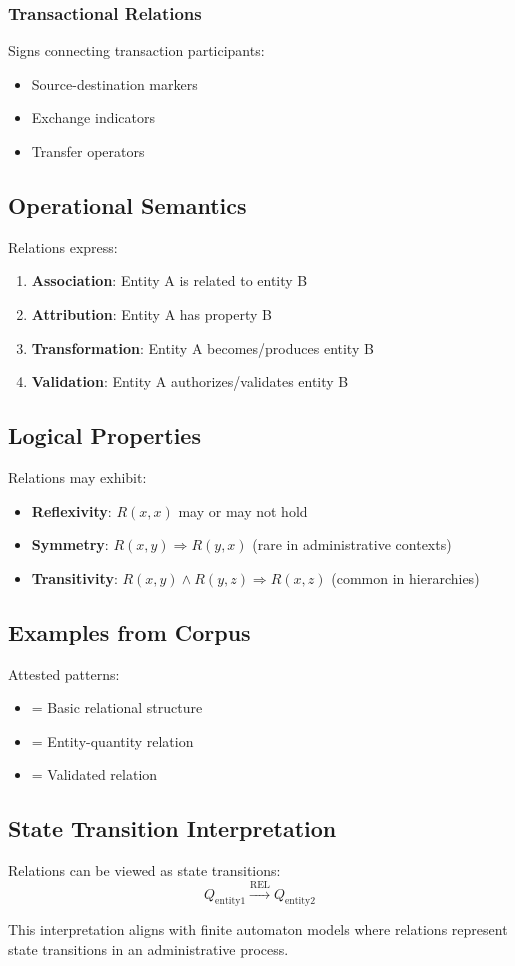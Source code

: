 \subsubsection{Transactional Relations}
Signs connecting transaction participants:
\begin{itemize}
    \item Source-destination markers
    \item Exchange indicators
    \item Transfer operators
\end{itemize}

\subsection{Operational Semantics}

Relations express:
\begin{enumerate}
    \item \textbf{Association}: Entity A is related to entity B
    \item \textbf{Attribution}: Entity A has property B
    \item \textbf{Transformation}: Entity A becomes/produces entity B
    \item \textbf{Validation}: Entity A authorizes/validates entity B
\end{enumerate}

\subsection{Logical Properties}

Relations may exhibit:
\begin{itemize}
    \item \textbf{Reflexivity}: $R(x,x)$ may or may not hold
    \item \textbf{Symmetry}: $R(x,y) \Rightarrow R(y,x)$ (rare in administrative contexts)
    \item \textbf{Transitivity}: $R(x,y) \land R(y,z) \Rightarrow R(x,z)$ (common in hierarchies)
\end{itemize}

\subsection{Examples from Corpus}

Attested patterns:
\begin{itemize}
    \item [ENTITY1][REL][ENTITY2] = Basic relational structure
    \item [ENTITY][REL][COUNT] = Entity-quantity relation
    \item [ENTITY1][REL][ENTITY2][TERMINAL] = Validated relation
\end{itemize}

\subsection{State Transition Interpretation}

Relations can be viewed as state transitions:
\[
Q_{\text{entity1}} \xrightarrow{\text{REL}} Q_{\text{entity2}}
\]

This interpretation aligns with finite automaton models where relations represent state transitions in an administrative process.
